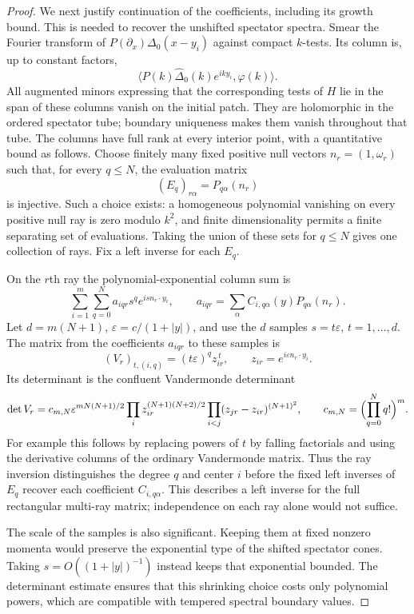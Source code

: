 \begin{proof}
We next justify continuation of the coefficients, including its
growth bound. This is needed to recover the unshifted spectator
spectra. Smear the Fourier transform of
$P(\partial_x)\Delta_0(x-y_i)$ against compact $k$-tests. Its column
is, up to constant factors,
\[
 \big\langle P(k)\widehat\Delta_0(k)e^{ik y_i},\varphi(k)\big\rangle.
\]
All augmented minors expressing that the corresponding tests of
$H$ lie in the span of these columns vanish on the initial patch.
They are holomorphic in the ordered spectator tube; boundary
uniqueness makes them vanish throughout that tube. The columns have
full rank at every interior point, with a quantitative bound as
follows. Choose finitely many fixed positive null vectors
$n_r=(1,\omega_r)$ such that, for every $q\le N$, the evaluation
matrix
\[
 (E_q)_{r\alpha}=P_{q\alpha}(n_r)
\]
is injective. Such a choice exists: a homogeneous polynomial
vanishing on every positive null ray is zero modulo $k^2$, and
finite dimensionality permits a finite separating set of
evaluations. Taking the union of these sets for $q\le N$ gives
one collection of rays. Fix a left inverse for each $E_q$.

On the $r$th ray the polynomial-exponential column sum is
\[
 \sum_{i=1}^m\sum_{q=0}^N
 a_{iqr}s^qe^{is n_r\cdot y_i},
 \qquad
 a_{iqr}=\sum_\alpha C_{i,q\alpha}(y)P_{q\alpha}(n_r).
\]
Let $d=m(N+1)$, $\varepsilon=c/(1+|y|)$, and use the
$d$ samples $s=t\varepsilon$, $t=1,\ldots,d$. The matrix
from the coefficients $a_{iqr}$ to these samples is
\[
 (V_r)_{t,(i,q)}=(t\varepsilon)^qz_{ir}^{\,t},
 \qquad z_{ir}=e^{i\varepsilon n_r\cdot y_i}.
\]
Its determinant is the confluent Vandermonde determinant
\begin{equation}\label{C:Vandermonde}
 \det V_r=c_{m,N}\varepsilon^{mN(N+1)/2}
 \prod_i z_{ir}^{(N+1)(N+2)/2}
 \prod_{i<j}(z_{jr}-z_{ir})^{(N+1)^2},
 \qquad c_{m,N}=\Bigl(\prod_{q=0}^Nq!\Bigr)^m.
\end{equation}
For example this follows by replacing powers of $t$ by falling
factorials and using the derivative columns of the ordinary
Vandermonde matrix. Thus the ray inversion distinguishes the
degree $q$ and center $i$ before the fixed left inverses of
$E_q$ recover each coefficient $C_{i,q\alpha}$. This describes
a left inverse for the full rectangular multi-ray matrix;
independence on each ray alone would not suffice.

The scale of the samples is also significant.  Keeping them at fixed
nonzero momenta would preserve the exponential type of the shifted
spectator cones.  Taking $s=O((1+|y|)^{-1})$ instead keeps that
exponential bounded.  The determinant estimate ensures that this
shrinking choice costs only polynomial powers, which are compatible
with tempered spectral boundary values.


\end{proof}
